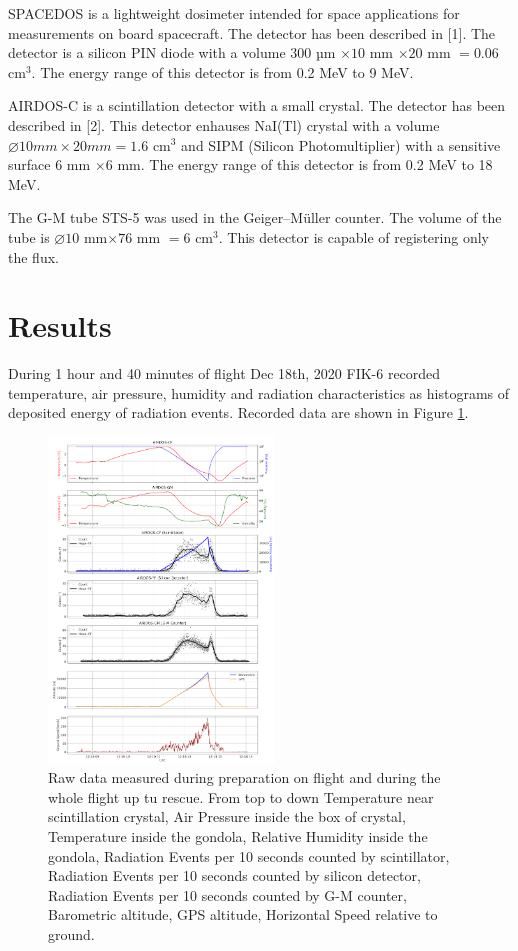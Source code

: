 \documentclass{Rpd}
\begin{document}
SPACEDOS is a lightweight dosimeter intended for space applications for measurements on board spacecraft. The detector has been described in [1]. The detector is a silicon PIN diode with a volume $300$ µm $\times 10$ mm $\times 20$ mm $= 0.06$ cm$^3$. The energy range of this detector is from 0.2 MeV to 9 MeV.

AIRDOS-C is a scintillation detector with a small crystal. The detector has been described in [2]. This detector enhauses NaI(Tl) crystal with a volume   $\diameter 10 mm \times 20 mm = 1.6$ cm$^3$ and SIPM (Silicon Photomultiplier) with a sensitive surface $6$ mm $\times 6$ mm. The energy range of this detector is from 0.2 MeV to 18 MeV.

The G-M tube STS-5 was used in the Geiger–Müller counter. The volume of the tube is $\diameter 10$ mm$ \times 76$ mm $= 6$ cm$^3$. This detector is capable of registering only the flux.

\section{Results}

During 1 hour and 40 minutes of flight Dec 18th, 2020 FIK-6 recorded temperature, air pressure, humidity and radiation characteristics as histograms of deposited energy of radiation events. Recorded data are shown in Figure \ref{FIK-6_RAW_data}.


\begin{center}
\begin{figure}%
	\centerline{\includegraphics[width=60mm]{img/FIK-6_RAW_data.png}}
	\caption{Raw data measured during preparation on flight and during the whole flight up tu rescue. From top to down Temperature near scintillation crystal, Air Pressure inside the box of crystal, Temperature inside the gondola, Relative Humidity inside the gondola, Radiation Events per 10 seconds counted by scintillator, Radiation Events per 10 seconds counted by silicon detector, Radiation Events per 10 seconds counted by G-M counter, Barometric altitude, GPS altitude, Horizontal Speed relative to ground. \label{FIK-6_RAW_data}}
\end{figure}
\end{center}
\end{document}
